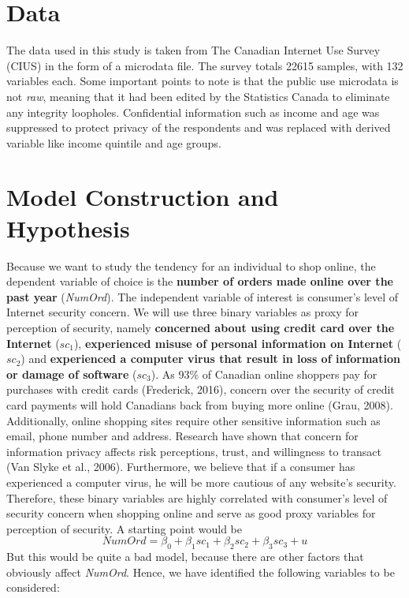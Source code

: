 \documentclass[11pt,twoside]{article}
\begin{document}
\section{Data}
The data used in this study is taken from The Canadian Internet Use Survey (CIUS) in the form of a microdata file. The survey totals 22615 samples, with 132 variables each. Some important points to note is that the public use microdata is not \textit{raw}, meaning that it had been edited by the Statistics Canada to eliminate any integrity loopholes. Confidential information such as income and age was suppressed to protect privacy of the respondents and was replaced with derived variable like income quintile and age groups.

\section{Model Construction and Hypothesis}
Because we want to study the tendency for an individual to shop online, the dependent variable of choice is the \textbf{number of orders made online over the past year} (\textit{NumOrd}). The independent variable of interest is consumer’s level of Internet security concern. We will use three binary variables as proxy for perception of security, namely \textbf{concerned about using credit card over the Internet} (\textit{$sc_1$}), \textbf{experienced misuse of personal information on Internet} (\textit{$sc_2$}) and \textbf{experienced a computer virus that result in loss of information or damage of software} (\textit{$sc_3$}). As 93\% of Canadian online shoppers pay for purchases with credit cards (Frederick, 2016), concern over the security of credit card payments will hold Canadians back from buying more online (Grau, 2008). Additionally, online shopping sites require other sensitive information such as email, phone number and address. Research have shown that concern for information privacy affects risk perceptions, trust, and willingness to transact (Van Slyke et al., 2006). Furthermore, we believe that if a consumer has experienced a computer virus, he will be more cautious of any website’s security. Therefore, these binary variables are highly correlated with consumer’s level of security concern when shopping online and serve as good proxy variables for perception of security. A starting point would be
\begin{equation}
    NumOrd = \beta_0 + \beta_1sc_1 + \beta_2sc_2 + \beta_3sc_3 + u
\end{equation}
But this would be quite a bad model, because there are other factors that obviously affect \textit{NumOrd}. Hence, we have identified the following variables to be considered:
\end{document}

